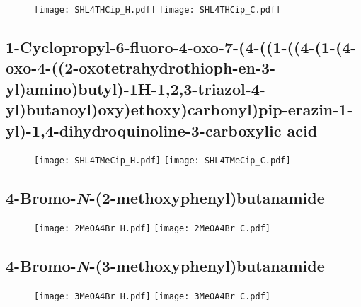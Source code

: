 \begin{figure}[H]
	\centering
		\texttt{[image: SHL4THCip\_H.pdf]}
		\texttt{[image: SHL4THCip\_C.pdf]}
\end{figure}

\subsection{1\hyp{}Cyclopropyl\hyp{}6\hyp{}fluoro\hyp{}4\hyp{}oxo\hyp{}7\hyp{}(4\hyp{}((1\hyp{}((4\hyp{}(1\hyp{}(4\hyp{}oxo\hyp{}4\hyp{}((2\hyp{}oxotetrahydrothioph\hyp{}en\hyp{}3\hyp{}yl)amino)butyl)\hyp{}1H\hyp{}1,2,3\hyp{}triazol\hyp{}4\hyp{}yl)butanoyl)oxy)ethoxy)carbonyl)pip\hyp{}erazin\hyp{}1\hyp{}yl)\hyp{}1,4\hyp{}dihydroquinoline\hyp{}3\hyp{}carboxylic acid }

\begin{figure}[H]
	\centering
		\texttt{[image: SHL4TMeCip\_H.pdf]}
		\texttt{[image: SHL4TMeCip\_C.pdf]}
\end{figure}

\subsection{4\hyp{}Bromo\hyp{}\textit{N}\hyp{}(2\hyp{}methoxyphenyl)butanamide }

\begin{figure}[H]
	\centering
		\texttt{[image: 2MeOA4Br\_H.pdf]}
		\texttt{[image: 2MeOA4Br\_C.pdf]}
\end{figure}

\subsection{4\hyp{}Bromo\hyp{}\textit{N}\hyp{}(3\hyp{}methoxyphenyl)butanamide }

\begin{figure}[H]
	\centering
		\texttt{[image: 3MeOA4Br\_H.pdf]}
		\texttt{[image: 3MeOA4Br\_C.pdf]}
\end{figure}

